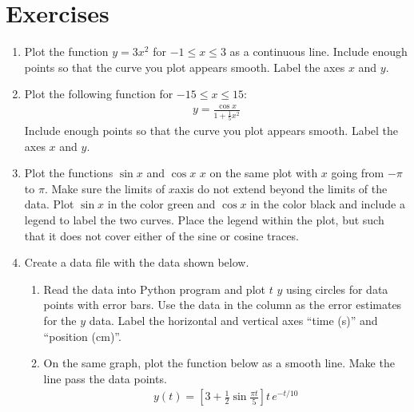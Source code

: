\documentclass[letterpaper,10pt,english]{sphinxmanual}
\begin{document}
\section{Exercises}
\label{\detokenize{chap5/chap5_plot:exercises}}\begin{enumerate}
%
\item {} 
\sphinxAtStartPar
Plot the function \(y=3x^2\) for \(-1 \le x \le 3\) as a continuous line.  Include enough points so that the curve you plot appears smooth.  Label the axes \(x\) and \(y\).

\item {} 
\sphinxAtStartPar
Plot the following function for \(-15 \le x \le 15\):
\begin{equation*}
\begin{split}y = \frac{\cos x}{1+\frac{1}{5}x^2}\end{split}
\end{equation*}
\sphinxAtStartPar
Include enough points so that the curve you plot appears smooth.  Label the axes \(x\) and \(y\).

\item {} 
\sphinxAtStartPar
Plot the functions \(\sin x\) and \(\cos x\)  \(x\) on the same plot with \(x\) going from \(-\pi\) to \(\pi\).  Make sure the limits of \(x\)\sphinxhyphen{}axis do not extend beyond the limits of the data.  Plot \(\sin x\) in the color green and \(\cos x\) in the color black and include a legend to label the two curves.  Place the legend within the plot, but such that it does not cover either of the sine or cosine traces.

\item {} 
\sphinxAtStartPar
Create a data file with the data shown below.
\begin{enumerate}
%
\item {} 
\sphinxAtStartPar
Read the data into Python program and plot \(t\)  \(y\) using circles for data points with error bars.  Use the data in the  column as the error estimates for the \(y\) data.  Label the horizontal and vertical axes “time (s)” and “position (cm)”.

\item {} 
\sphinxAtStartPar
On the same graph, plot the function below as a smooth line.  Make the line pass  the data points.
\begin{equation*}
\begin{split}y(t) = \left[3 +
       \frac{1}{2}\sin\frac{\pi t}{5}\right]
       t\, e^{-t/10}\end{split}
\end{equation*}
\begin{sphinxVerbatim}[commandchars=\\\{\},numbers=left,firstnumber=1,stepnumber=1]
   
 
     


\end{sphinxVerbatim}
\end{enumerate}
\end{enumerate}
\end{document}
